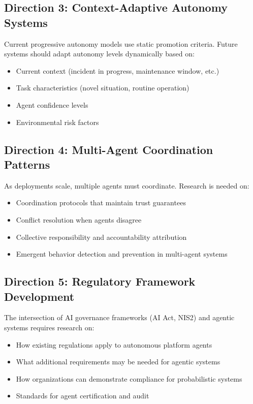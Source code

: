 \subsection{Direction 3: Context-Adaptive Autonomy Systems}
\label{subsec:direction3}

Current progressive autonomy models use static promotion criteria. Future systems should adapt autonomy levels dynamically based on:
\begin{itemize}
    \item Current context (incident in progress, maintenance window, etc.)
    \item Task characteristics (novel situation, routine operation)
    \item Agent confidence levels
    \item Environmental risk factors
\end{itemize}

\subsection{Direction 4: Multi-Agent Coordination Patterns}
\label{subsec:direction4}

As deployments scale, multiple agents must coordinate. Research is needed on:
\begin{itemize}
    \item Coordination protocols that maintain trust guarantees
    \item Conflict resolution when agents disagree
    \item Collective responsibility and accountability attribution
    \item Emergent behavior detection and prevention in multi-agent systems
\end{itemize}

\subsection{Direction 5: Regulatory Framework Development}
\label{subsec:direction5}

The intersection of AI governance frameworks (AI Act, NIS2) and agentic systems requires research on:
\begin{itemize}
    \item How existing regulations apply to autonomous platform agents
    \item What additional requirements may be needed for agentic systems
    \item How organizations can demonstrate compliance for probabilistic systems
    \item Standards for agent certification and audit
\end{itemize}


